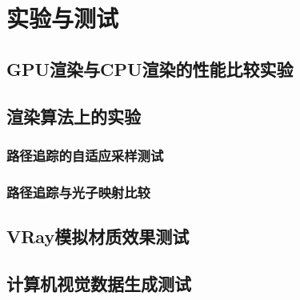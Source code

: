 \chapter{实验与测试}
\label{cha:evaluations}

\section{GPU渲染与CPU渲染的性能比较实验}

\section{渲染算法上的实验}
\subsection{路径追踪的自适应采样测试}
\subsection{路径追踪与光子映射比较}

\section{VRay模拟材质效果测试}

\section{计算机视觉数据生成测试}